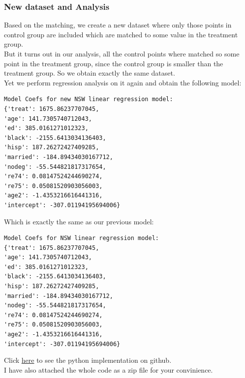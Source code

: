 \documentclass{article}
\begin{document}
\subsubsection{New dataset and Analysis}
Based on the matching, we create a new dataset where only
those points in control group are included which are matched to some value 
in the treatment group.\\
But it turns out in our analysis, all the control points where
matched so some point in the treatment group, since the control group
is smaller than the treatment group. So we obtain exactly the same dataset.\\
Yet we perform regression analysis on it again and obtain the following model:
\begin{verbatim}
Model Coefs for new NSW linear regression model:
{'treat': 1675.86237707045, 
'age': 141.7305740712043, 
'ed': 385.0161271012323, 
'black': -2155.6413034136403, 
'hisp': 187.26272427409285, 
'married': -184.89434030167712, 
'nodeg': -55.544821817317654, 
're74': 0.08147524244690274, 
're75': 0.05081520903056003, 
'age2': -1.4353216616441316, 
'intercept': -307.01194195694006}
\end{verbatim}
Which is exactly the same as our previous model:\\
\begin{verbatim}
Model Coefs for NSW linear regression model:
{'treat': 1675.86237707045, 
'age': 141.7305740712043, 
'ed': 385.0161271012323, 
'black': -2155.6413034136403, 
'hisp': 187.26272427409285, 
'married': -184.89434030167712, 
'nodeg': -55.544821817317654, 
're74': 0.08147524244690274, 
're75': 0.05081520903056003, 
'age2': -1.4353216616441316, 
'intercept': -307.01194195694006}
\end{verbatim}

Click \href{https://github.com/ParthGupte/CausalAssignment}{here} to see the python implementation on github.\\
I have also attached the whole code as a zip file for your convinience.
\end{document}
